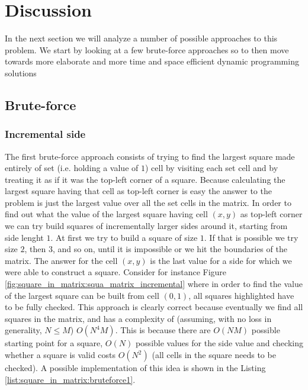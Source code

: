 \section{Discussion}
\label{square_in_matrix:sec:discussion}
In the next section we will analyze a number of possible approaches to this problem. We start by
looking at a few brute-force approaches so to then move towards more elaborate and more time and
space efficient dynamic programming solutions

\subsection{Brute-force}
\subsubsection{Incremental side}
\label{square_in_matrix:sec:incremental_side}
The first brute-force approach consists of trying to find the largest square made entirely of set
(i.e. holding a value of $1$) cell by visiting each set cell and by treating it as if it was the
top-left corner of a square. Because calculating the largest square having that cell as top-left
corner is easy the answer to the problem is just the largest value over all the set cells in the
matrix. In order to find out what the value of the largest square having cell $(x,y)$ as top-left
corner we can try build squares of incrementally larger sides around it, starting from side lenght
$1$. At first we try to build a square of size $1$. If that is possible we try size $2$, then $3$,
and so on, until it is impossible or we hit the boundaries of the matrix. The answer for the cell
$(x,y)$ is the last value for a side for which we were able to construct a square. Consider for
instance Figure \ref{fig:square_in_matrix:squa_matrix_incremental} where in order to find the value
of the largest square can be built from cell $(0,1)$, all squares highlighted have to be fully
checked. This approach is clearly correct because eventually we find all squares in the matrix, and
has a complexity of (assuming, with no loss in generality, $N \leq M$) $O(N^4M)$. This is because
there are $O(NM)$ possible starting point for a square, $O(N)$ possible values for the side value
and checking whether a square is valid costs $O(N^2)$ (all cells in the square needs to be checked).
A possible implementation of this idea is shown in the Listing
\ref{list:square_in_matrix:bruteforce1}.




